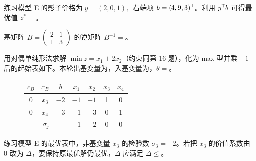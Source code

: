 \Q[\diff{基础·K5}] 练习模型 E 的影子价格为 $y=(2,0,1)$，右端项 $b=(4,9,3)^{\mathsf T}$。利用 $y^{\mathsf T} b$ 可得最优值 $z^*=$\underline{\hspace{2cm}}。
\begin{figure}[!htbp]\centering
{}
\end{figure}

\Q[\diff{基础·K1}] 基矩阵 $B=\begin{pmatrix}2&1\\1&3\end{pmatrix}$ 的逆矩阵 $B^{-1}=$\underline{\hspace{3cm}}。

\Q[\diff{基础·K6}] 用对偶单纯形法求解 $\min z=x_1+2x_2$（约束同第 16 题），化为 max 型并乘 $-1$ 后的起始表如下。本轮出基变量为\underline{\hspace{1.2cm}}，入基变量为\underline{\hspace{1.2cm}}，$\theta=$\underline{\hspace{1.2cm}}。
\begin{figure}[!htbp]\centering
\small
\begin{tabular}{@{}ccc|cccc@{}}\toprule
$c_B$ & $x_B$ & $b$ & $x_1$ & $x_2$ & $x_3$ & $x_4$\\\midrule
0 & $x_3$ & $-2$ & $-1$ & $-1$ & 1 & 0\\
0 & $x_4$ & $-3$ & $-1$ & $-3$ & 0 & 1\\\midrule
\multicolumn{3}{c|}{$\sigma_j$} & $-1$ & $-2$ & 0 & 0\\\bottomrule
\end{tabular}
\end{figure}

\Q[\diff{基础·K8}] 练习模型 E 的最优表中，非基变量 $x_3$ 的检验数 $\sigma_3=-2$。若把 $x_3$ 的价值系数由 0 改为 $\Delta$，要保持原最优解仍最优，$\Delta$ 应满足 $\Delta\le$\underline{\hspace{1.5cm}}。

\medskip
{}\noindent{}

